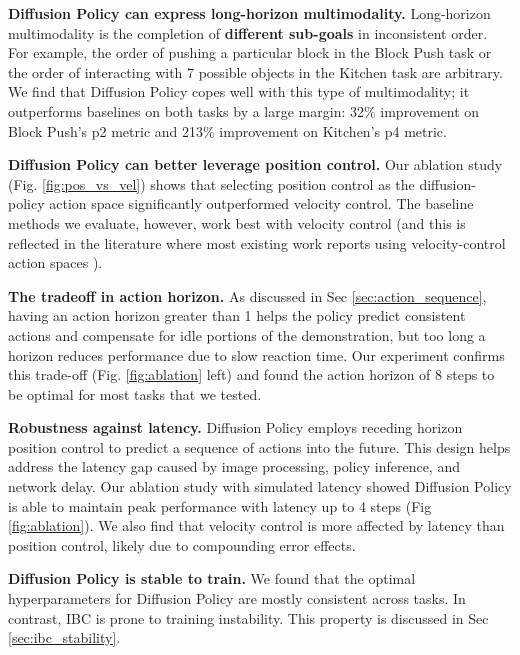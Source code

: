 \textbf{Diffusion Policy can express long-horizon multimodality.}
Long-horizon multimodality is the completion of \textbf{different sub-goals} in inconsistent order. For example, the order of pushing a particular block in the Block Push task or the order of interacting with 7 possible objects in the Kitchen task are arbitrary.
We find that Diffusion Policy copes well with this type of multimodality; it outperforms baselines on both tasks by a large margin: 32\% improvement on Block Push's p2 metric and 213\% improvement on Kitchen's p4 metric.

\textbf{Diffusion Policy can better leverage position control.}
\label{sec:eval_pos_vs_vel}
Our ablation study (Fig. \ref{fig:pos_vs_vel}) shows that selecting position control as the diffusion-policy action space significantly outperformed velocity control. The baseline methods we evaluate, however, work best with velocity control (and this is reflected in the literature where most existing work reports using velocity-control action spaces \cite{robomimic, bet, zhang2018deep, florence2019self, mandlekar2020learning, mandlekar2020iris}).



\textbf{The tradeoff in action horizon.}
As discussed in Sec \ref{sec:action_sequence},
having an action horizon greater than 1 helps the policy predict consistent actions and compensate for idle portions of the demonstration, but too long a horizon reduces performance due to slow reaction time. Our experiment confirms this trade-off (Fig. \ref{fig:ablation} left) and found the action horizon of 8 steps to be optimal for most tasks that we tested.

\textbf{Robustness against latency.}
Diffusion Policy employs receding horizon position control to predict a sequence of actions into the future. This design helps address the latency gap caused by image processing, policy inference, and network delay. Our ablation study with simulated latency showed Diffusion Policy is able to maintain peak performance with latency up to 4 steps (Fig \ref{fig:ablation}). We also find that velocity control is more affected by latency than position control, likely due to compounding error effects.



\textbf{Diffusion Policy is stable to train.}
We found that the optimal hyperparameters for Diffusion Policy are mostly consistent across tasks.  In contrast,  IBC \cite{ibc} is prone to training instability. This property is discussed in Sec \ref{sec:ibc_stability}.



